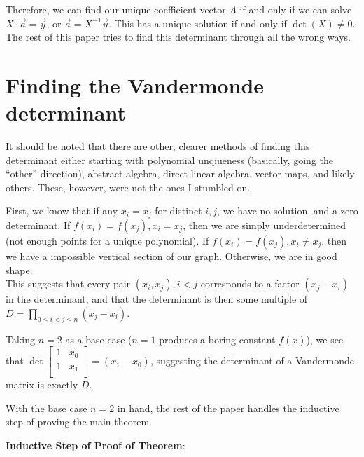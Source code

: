 \documentclass[11pt, oneside]{article} 	%
\begin{document}
Therefore, we can find our unique coefficient vector $A$ if and only if we can solve $X \cdot \vec{a} = \vec{y}$, or $\vec{a} = X^{-1} \vec{y}$.  This has a unique solution if and only if $\det(X) \neq 0$.  The rest of this paper tries to find this determinant through all the wrong ways.

\section{Finding the Vandermonde determinant}

It should be noted that there are other, clearer methods of finding this determinant\cite{1} either starting with polynomial unqiueness (basically, going the ``other'' direction), abstract algebra, direct linear algebra, vector maps, and likely others.  These, however, were not the ones I stumbled on.

First, we know that if any $x_i = x_j$ for distinct $i, j$, we have no solution, and a zero determinant. If $f(x_i) = f(x_j), x_i = x_j$, then we are simply underdetermined (not enough points for a unique polynomial).   If $f(x_i) = f(x_j), x_i \neq x_j$, then we have a impossible vertical section of our graph.  Otherwise, we are in good shape.  
\\

This suggests that every pair $(x_i, x_j), i < j$ corresponds to a factor  $(x_j - x_i)$ in the determinant, and that the determinant is then some multiple of $D = \prod_{0 \leq i < j \leq n}(x_j-x_i)$.

Taking $n=2$ as a base case ($n=1$ produces a boring constant $f(x)$), we see that 
 $\det\begin{bmatrix}
1 & x_0  \\
1 & x_1  \\
\end{bmatrix} = (x_1 - x_0)$, suggesting the determinant of a Vandermonde matrix is exactly $D$.  


With the base case $n=2$ in hand, the rest of the paper handles the inductive step of proving the main theorem.

\textbf{Inductive Step of Proof of Theorem}:
\end{document}
